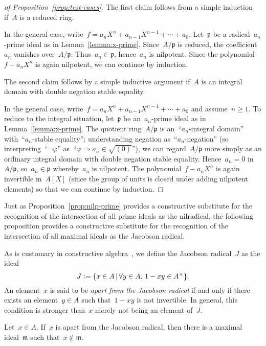 \documentclass[envcountsect,envcountsame,runningheads]{llncs}
\newcommand{\mmm}{\mathfrak{m}}
\newcommand{\ppp}{\mathfrak{p}}
\newcommand{\defeq}{\vcentcolon=}
\renewcommand{\_}{\mathpunct{.}\,}
\begin{document}
\begin{proof}[of Proposition~\ref{prop:test-cases}]
The first claim follows from a simple induction if~$A$ is a reduced
ring.

In the general case, write~$f = a_n X^n + a_{n-1} X^{n-1} + \cdots + a_0$. Let~$\ppp$
be a radical~$a_n$-prime ideal as in Lemma~\ref{lemma:x-prime}. Since~$A/\ppp$
is reduced, the coefficient~$a_n$ vanishes over~$A/\ppp$. Thus~$a_n \in \ppp$,
hence~$a_n$ is nilpotent. Since the polynomial~$f - a_n X^n$ is again
nilpotent, we can continue by induction.

The second claim follows by a simple inductive argument if~$A$ is an
integral domain with double negation stable equality.

In the general case, write~$f = a_n X^n + a_{n-1} X^{n-1} + \cdots + a_0$
and assume~$n \geq 1$. To reduce to the integral situation, let~$\ppp$ be
an~$a_n$-prime ideal as in Lemma~\ref{lemma:x-prime}. The quotient
ring~$A/\ppp$ is an~``$a_n$-integral domain'' with~``$a_n$-stable equality'';
understanding negation as~``$a_n$-negation'' (so interpreting~``$\neg\varphi$''
as~``$\varphi \Rightarrow a_n \in \sqrt{(0)}$''), we can regard~$A/\ppp$ more
simply as an ordinary integral domain with double negation stable equality.
Hence~$a_n = 0$ in~$A/\ppp$, so~$a_n \in \ppp$ whereby~$a_n$ is nilpotent. The
polynomial~$f - a_n X^n$ is again invertible in~$A[X]$ (since the group of
units is closed under adding nilpotent elements) so that we can continue by
induction.
\end{proof}

Just as Proposition~\ref{prop:nilp-prime} provides a constructive substitute
for the recognition of the intersection of all prime ideals as the nilradical,
the following proposition provides a constructive substitute for the
recognition of the intersection of all maximal ideals as the Jacobson radical.

As is customary in constructive
algebra~\cite[Section~IX.1]{lombardi-quitte:constructive-algebra}, we define
the Jacobson radical~$J$ as the ideal
\[ J \defeq \{ x \in A \,|\, \forall y \in A\_ 1 - xy \in A^\times \}. \]
An element~$x$ is said to be \emph{apart from the Jacobson radical} if and only if
there exists an element~$y \in A$ such that~$1-xy$ is not invertible. In
general, this condition is stronger than~$x$ merely not being an element of~$J$.

\begin{proposition}Let~$x \in A$. If~$x$ is apart from the Jacobson radical, then
there is a maximal ideal~$\mmm$ such that~$x \not\in \mmm$.
\end{proposition}
\end{document}
